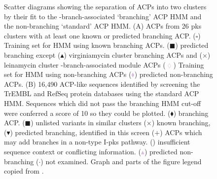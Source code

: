 	\setlength\fboxsep{5pt}
	\setlength\fboxrule{1.5pt}
	\begin{figure}[]
	\centering
	\caption[Scatter diagrams showing the separation of ACPs into two clusters by their fit to the \bet-branch-associated ‘branching’ ACP HMM and the non-branching ‘standard’ ACP HMM.]{Scatter diagrams showing the separation of ACPs into two clusters by their fit to the \bet-branch-associated ‘branching’ ACP HMM and the non-branching ‘standard’ ACP HMM. (A) ACPs from 26 pks clusters with at least one known or predicted branching ACP. (\textcolor{PineGreen}{$ \square $}) Training set for HMM using known branching ACPs. (\textcolor{PineGreen}{$ \blacksquare $}) predicted branching except (\textcolor{PineGreen}{$ \blacktriangle $}) virginiamycin cluster branching ACPs and (\textcolor{PineGreen}{$ \times $}) leinamycin cluster \bet-branch-associated module ACPs (\textcolor{Thistle}{$\lozenge$}) Training set for HMM using non-branching ACPs (\textcolor{Thistle}{$ \blacklozenge $}) predicted non-branching ACPs. (B) 16,490 ACP-like sequences identified by screening the TrEMBL and RefSeq protein databases using the standard ACP HMM. Sequences which did not pass the branching HMM cut-off were conferred a score of 10 so they could be plotted. (\textcolor{PineGreen}{$ \blacklozenge $}) branching ACP. (\textcolor{PineGreen}{$ \blacksquare $}) unlisted variants in similar clusters (\textcolor{PineGreen}{$ \times $}) known branching, (\textcolor{PineGreen}{$ \blacktriangledown $}) predicted branching, identified in this screen (\textcolor{PineGreen}{$ + $}) ACPs which may add branches in a non-type I-pks pathway. (\textcolor{Dandelion}{\textbullet}) insufficient sequence context or conflicting information. (\textcolor{Thistle}{$ \blacktriangle $}) predicted non-branching ($ \cdotp $) not examined. Graph and parts of the figure legend copied from \textcite{Haines2013}.}
	\label{fig:hmmplot}
	\end{figure}
		
